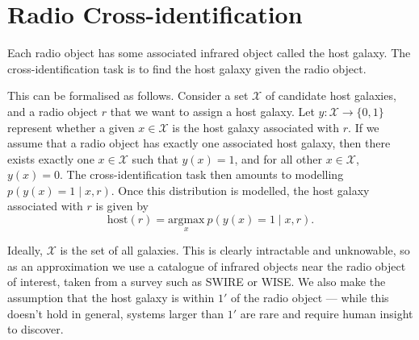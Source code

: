 \section{Radio Cross-identification}
\label{sec:cross-identification}

    Each radio object has some associated infrared object called the host
    galaxy. The cross-identification task is to find the host galaxy given the
    radio object.
    
    This can be formalised as follows. Consider a set $\mathcal X$ of candidate
    host galaxies, and a radio object $r$ that we want to assign a host galaxy.
    Let $y : \mathcal X \to \{0, 1\}$ represent whether a given $x \in \mathcal
    X$ is the host galaxy associated with $r$. If we assume that a radio object
    has exactly one associated host galaxy, then there exists exactly one $x
    \in \mathcal X$ such that $y(x) = 1$, and for all other $x \in \mathcal X$,
    $y(x) = 0$. The cross-identification task then amounts to modelling $p(y(x)
    = 1 \mid x, r)$. Once this distribution is modelled, the host galaxy
    associated with $r$ is given by
    \begin{equation}
        \label{eq:cross-identification}
        \mbox{host}(r) = \underset{x}{\mbox{argmax}}\ p(y(x) = 1 \mid x, r).
    \end{equation}

    Ideally, $\mathcal X$ is the set of all galaxies. This is clearly
    intractable and unknowable, so as an approximation we use a catalogue of
    infrared objects near the radio object of interest, taken from a survey
    such as SWIRE or WISE. We also make the assumption that the host galaxy is
    within $1'$ of the radio object --- while this doesn't hold in general,
    systems larger than $1'$ are rare and require human insight to
    discover\cite{banfield16}.

